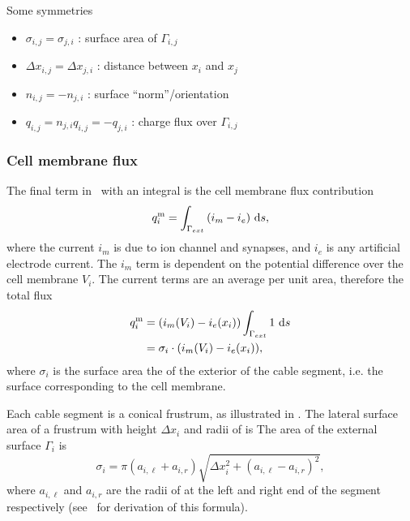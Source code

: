 Some symmetries
\begin{itemize}
    \item $\sigma_{i,j}=\sigma_{j,i}$ : surface area of $\Gamma_{i,j}$
    \item $\Delta x_{i,j}=\Delta x_{j,i}$ : distance between $x_i$ and $x_j$
    \item $n_{i,j}=-n_{j,i}$ : surface ``norm''/orientation
    \item $q_{i,j}=n_{j,i}q_{i,j}=-q_{j,i}$ : charge flux over $\Gamma_{i,j}$
\end{itemize}

\subsubsection{Cell membrane flux}
The final term in~ with an integral is the cell membrane flux contribution
\begin{equation}
    q_{i}^{\text{m}} = \int_{\Gamma_{ext}} {(i_m - i_e)} ~\text{d}{s},
\end{equation}
where the current $i_m$ is due to ion channel and synapses, and $i_e$ is any artificial electrode current.
The $i_m$ term is dependent on the potential difference over the cell membrane $V_i$.
The current terms are an average per unit area, therefore the total flux 
\begin{align}
    q_{i}^{\text{m}}
        & = (i_m(V_i) - i_e(x_i))\int_{\Gamma_{ext}} {1} ~\text{d}{s} \nonumber \\
        & = \sigma_i\cdot(i_m(V_i) - i_e(x_i)),
        \label{eq:q_im}
\end{align}
where $\sigma_i$ is the surface area the of the exterior of the cable segment, i.e. the surface corresponding to the cell membrane.

Each cable segment is a conical frustrum, as illustrated in .
The lateral surface area of a frustrum with height $\Delta x_i$ and radii of  is
The area of the external surface $\Gamma_{i}$ is
\begin{equation}
    \sigma_i = \pi (a_{i,\ell} + a_{i,r}) \sqrt{\Delta x_i^2 + (a_{i,\ell} - a_{i,r})^2},
    \label{eq:cv_volume}
\end{equation}
where $a_{i,\ell}$ and $a_{i,r}$ are the radii of at the left and right end of the segment respectively (see~ for derivation of this formula).

